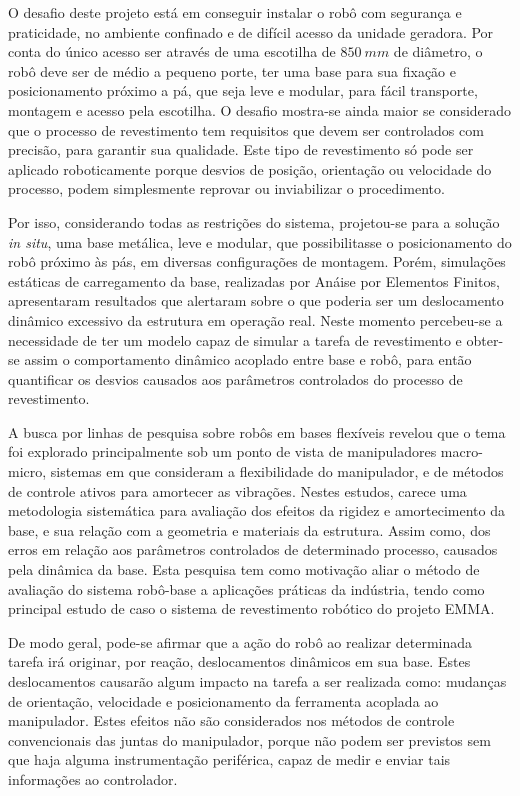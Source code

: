 O desafio deste projeto está em conseguir instalar o robô com segurança e
praticidade, no ambiente confinado e de difícil acesso da unidade geradora. Por
conta do único acesso ser através de uma escotilha de $850~mm$ de diâmetro, o
robô deve ser de médio a pequeno porte, ter uma base para sua fixação e
posicionamento próximo a pá, que seja leve e modular, para fácil transporte,
montagem e acesso pela escotilha. O desafio mostra-se ainda maior se considerado
que o processo de revestimento tem requisitos que devem ser controlados com
precisão, para garantir sua qualidade. Este tipo de revestimento só pode ser
aplicado roboticamente porque desvios de posição, orientação ou velocidade do
processo, podem simplesmente reprovar ou inviabilizar o procedimento.

Por isso, considerando todas as restrições do sistema, projetou-se para a
solução \textit{in situ}, uma base metálica, leve e modular, que possibilitasse
o posicionamento do robô próximo às pás, em diversas configurações de montagem.
Porém, simulações estáticas de carregamento da base, realizadas por Anáise por
Elementos Finitos, apresentaram resultados que alertaram sobre o que poderia ser
um deslocamento dinâmico excessivo da estrutura em operação real.
Neste momento percebeu-se a necessidade de ter um modelo capaz de simular a
tarefa de revestimento e obter-se assim o comportamento dinâmico acoplado entre
base e robô, para então quantificar os desvios causados aos parâmetros
controlados do processo de revestimento.

A busca por linhas de pesquisa sobre robôs em bases flexíveis revelou que o tema
foi explorado principalmente sob um ponto de vista de manipuladores macro-micro,
sistemas em que consideram a flexibilidade do manipulador, e de métodos de
controle ativos para amortecer as vibrações. Nestes estudos, carece uma
metodologia sistemática para avaliação dos efeitos da rigidez e
amortecimento da base, e sua relação com a geometria e materiais da estrutura.
Assim como, dos erros em relação aos parâmetros controlados de determinado
processo, causados pela dinâmica da base. Esta pesquisa tem como motivação aliar
o método de avaliação do sistema robô-base a aplicações práticas da indústria,
tendo como principal estudo de caso o sistema de revestimento robótico do
projeto EMMA.

De modo geral, pode-se afirmar que a ação do robô ao realizar
determinada tarefa irá originar, por reação, deslocamentos dinâmicos em sua
base. Estes deslocamentos causarão algum impacto na tarefa a ser realizada como:
mudanças de orientação, velocidade e posicionamento da ferramenta acoplada ao
manipulador. Estes efeitos não são considerados nos métodos de controle
convencionais das juntas do manipulador, porque não podem ser previstos sem que
haja alguma instrumentação periférica, capaz de medir e enviar tais informações
ao controlador.

